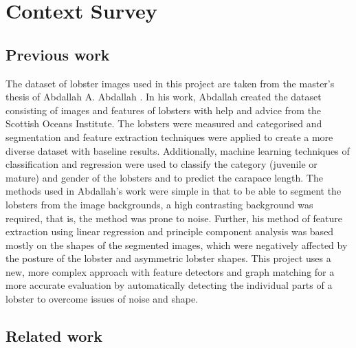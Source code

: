 \section{Context Survey}
\renewcommand{\imgpath}{tex/litreview/imgs}

\subsection{Previous work}
The dataset of lobster images used in this project are taken from the master's thesis of Abdallah A. Abdallah \cite{lobster-thesis}. In his work, Abdallah created the dataset consisting of images and features of lobsters with help and advice from the Scottish Oceans Institute. The lobsters were measured and categorised and segmentation and feature extraction techniques were applied to create a more diverse dataset with baseline results. Additionally, machine learning techniques of classification and regression were used to classify the category (juvenile or mature) and gender of the lobsters and to predict the carapace length. 
\n
The methods used in Abdallah's work were simple in that to be able to segment the lobsters from the image backgrounds, a high contrasting background was required, that is, the method was prone to noise. Further, his method of feature extraction using linear regression and principle component analysis was based mostly on the shapes of the segmented images, which were negatively affected by the posture of the lobster and asymmetric lobster shapes. This project uses a new, more complex approach with feature detectors and graph matching for a more accurate evaluation by automatically detecting the individual parts of a lobster to overcome issues of noise and shape. 

\subsection{Related work}

